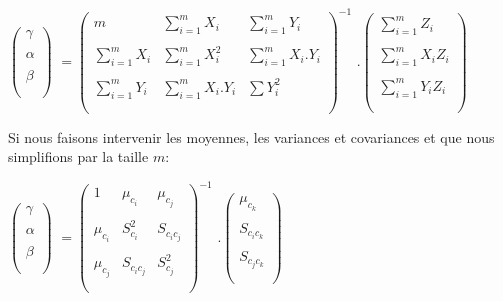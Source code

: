 \documentclass[a4paper]{article}
\begin{document}
\begin{enumerate}
$\begin{pmatrix}
\gamma\\ \\
\alpha\\ \\
\beta\\ \\
\end{pmatrix}$
$=\begin{pmatrix}
m&\sum_{i=1}^{m}X_{i}&\sum_{i=1}^{m}Y_{i}\\ \\
\sum_{i=1}^{m}X_{i}&\sum_{i=1}^{m} X_{i}^2&\sum_{i=1}^{m}X_{i}.Y_{i}\\ \\
\sum_{i=1}^{m}Y_{i}&\sum_{i=1}^{m}X_{i}.Y_{i}&\sum Y_{i}^2\\ \\
\end{pmatrix}^{-1}$
$.\begin{pmatrix}
\sum_{i=1}^{m}Z_{i}\\ \\
\sum_{i=1}^{m}X_{i}Z_{i}\\ \\
\sum_{i=1}^{m}Y_{i}Z_{i}\\ \\
\end{pmatrix}$

Si nous faisons intervenir les moyennes, les variances et covariances et que nous simplifions par la taille $m$:

$\begin{pmatrix}
\gamma\\ \\
\alpha\\ \\
\beta\\ \\
\end{pmatrix}$
$=\begin{pmatrix}
1&\mu_{c_{i}}&\mu_{c_{j}}\\ \\

\mu_{c_{i}}&S_{c_{i}}^{2}&S_{c_{i}c_{j}} \\ \\

\mu_{c_{j}}&S_{c_{i}c_{j}}&S_{c_{j}}^{2}\\ \\
\end{pmatrix}^{-1}$
$.\begin{pmatrix}
\mu_{c_{k}}\\ \\
S_{c_{i}c_{k}}\\ \\
S_{c_{j}c_{k}}\\ \\

\end{pmatrix}$

\end{enumerate}
\end{document}
